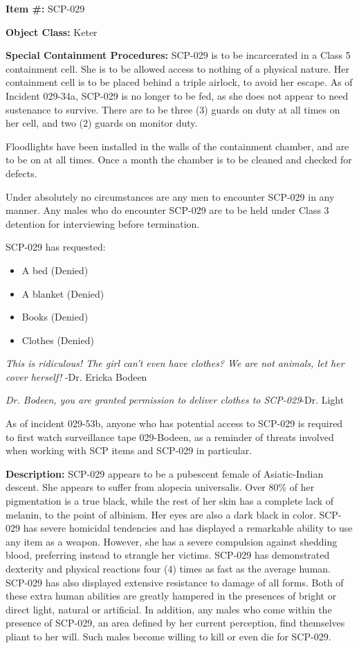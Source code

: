 
\textbf{Item \#:} SCP-029

\textbf{Object Class:} Keter

\textbf{Special Containment Procedures:} SCP-029 is to be incarcerated in a Class 5 containment cell. She is to be allowed access to nothing of a physical nature. Her containment cell is to be placed behind a triple airlock, to avoid her escape. As of Incident 029-34a, SCP-029 is no longer to be fed, as she does not appear to need sustenance to survive. There are to be three (3) guards on duty at all times on her cell, and two (2) guards on monitor duty.

Floodlights have been installed in the walls of the containment chamber, and are to be on at all times. Once a month the chamber is to be cleaned and checked for defects.

Under absolutely no circumstances are any men to encounter SCP-029 in any manner. Any males who do encounter SCP-029 are to be held under Class 3 detention for interviewing before termination.

SCP-029 has requested:
\begin{itemize}
\item A bed (Denied)
\item A blanket (Denied)
\item Books (Denied)
\item Clothes (Denied)
\end{itemize}

\textsl{This is ridiculous! The girl can't even have clothes? We are not animals, let her cover herself!} -Dr. Ericka Bodeen

\textsl{Dr. Bodeen, you are granted permission to deliver clothes to SCP-029}\linebreak -Dr. Light

As of incident 029-53b, anyone who has potential access to SCP-029 is required to first watch surveillance tape 029-Bodeen, as a reminder of threats involved when working with SCP items and SCP-029 in particular.

\textbf{Description:} SCP-029 appears to be a pubescent female of Asiatic-Indian descent. She appears to suffer from alopecia universalis. Over 80\% of her pigmentation is a true black, while the rest of her skin has a complete lack of melanin, to the point of albinism. Her eyes are also a dark black in color.
\newpage
SCP-029 has severe homicidal tendencies and has displayed a remarkable ability to use any item as a weapon. However, she has a severe compulsion against shedding blood, preferring instead to strangle her victims. SCP-029 has demonstrated dexterity and physical reactions four (4) times as fast as the average human. SCP-029 has also displayed extensive resistance to damage of all forms. Both of these extra human abilities are greatly hampered in the presences of bright or direct light, natural or artificial. In addition, any males who come within the presence of SCP-029, an area defined by her current perception, find themselves pliant to her will. Such males become willing to kill or even die for SCP-029.

